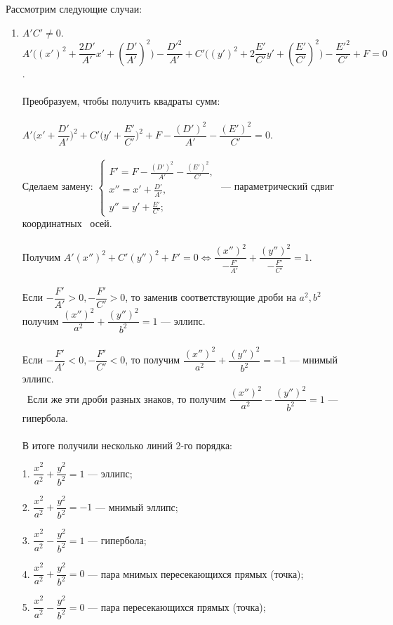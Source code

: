 \documentclass[a4paper, 12pt]{report}
\begin{document}
Рассмотрим следующие случаи:\begin{enumerate}
	\item $A'C' \neq 0$.\\
	$A'\Big((x')^2 + \dfrac{2D'}{A'}x' + (\dfrac{D'}{A'})^2\Big) - \dfrac{D'^2}{A'} + C'\Big((y')^2 + 2\dfrac{E'}{C'}y' + (\dfrac{E'}{C'})^2\Big) - \dfrac{E'^2}{C'} + F = 0$.\\\\
	Преобразуем, чтобы получить квадраты сумм:\\\\
	$A'\Big(x' + \dfrac{D'}{A'}\Big)^2 + C'\Big(y' + \dfrac{E'}{C'}\Big)^2 + F - \dfrac{(D')^2}{A'} - \dfrac{(E')^2}{C'} = 0$. \\\\
	Сделаем замену: $\begin{cases}
		F' = F - \frac{(D')^2}{A'} - \frac{(E')^2}{C'}, \\
		x'' = x' + \frac{D'}{A'}, \\
		y'' = y' + \frac{E'}{C'};
	\end{cases}$ --- параметрический сдвиг координатных~ осей.\\\\
	Получим $A'(x'')^2 + C'(y'')^2 + F' = 0 \Leftrightarrow \dfrac{(x'')^2}{-\frac{F'}{A'}} + \dfrac{(y'')^2}{-\frac{F'}{C'}} = 1$.\\\\
	Если $-\dfrac{F'}{A'} > 0, -\dfrac{F'}{C'} > 0$, то заменив соответствующие дроби на $a^2, b^2$ получим $\dfrac{(x'')^2}{a^2} + \dfrac{(y'')^2}{b^2} = 1$ --- эллипс.\\\\
	Если $-\dfrac{F'}{A'} < 0, -\dfrac{F'}{C'} < 0$, то получим $\dfrac{(x'')^2}{a^2} + \dfrac{(y'')^2}{b^2} = -1$ --- мнимый эллипс.\\\
	Если же эти дроби разных знаков, то получим $\dfrac{(x'')^2}{a^2} - \dfrac{(y'')^2}{b^2} = 1$ --- гипербола.\\\\
	В итоге получили несколько линий 2-го порядка:
	
	1. $\dfrac{x^2}{a^2} + \dfrac{y^2}{b^2} = 1$ --- эллипс;
	
	2. $\dfrac{x^2}{a^2} + \dfrac{y^2}{b^2} = -1$ --- мнимый эллипс;
	
	3. $\dfrac{x^2}{a^2} - \dfrac{y^2}{b^2} = 1$ --- гипербола;
	
	4. $\dfrac{x^2}{a^2} + \dfrac{y^2}{b^2} = 0$ --- пара мнимых пересекающихся прямых (точка);
	
	5. $\dfrac{x^2}{a^2} - \dfrac{y^2}{b^2} = 0$ --- пара пересекающихся прямых (точка);
	

\end{enumerate}
\end{document}
